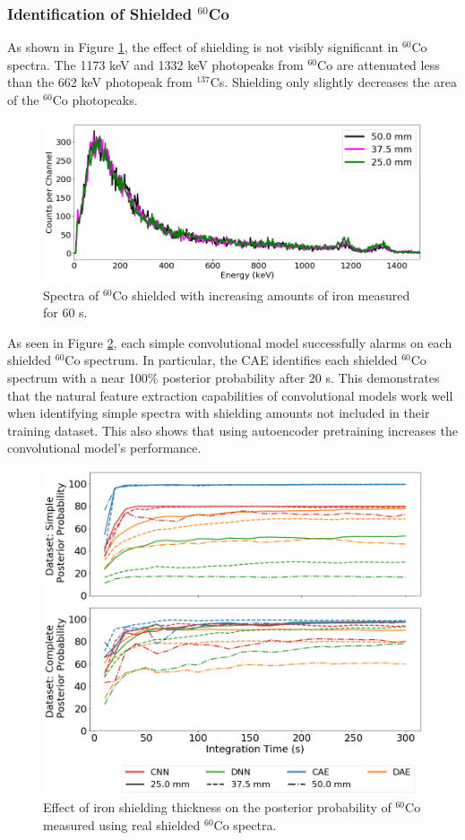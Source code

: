 \subsubsection{Identification of Shielded $^{60}$Co}

As shown in Figure \ref{fig:shielded_co60}, the effect of shielding is not visibly significant in $^{60}$Co spectra. The 1173 keV and 1332 keV photopeaks from $^{60}$Co are attenuated less than the 662 keV photopeak from $^{137}$Cs. Shielding only slightly decreases the area of the $^{60}$Co photopeaks.

\begin{figure}[H]
	\centering
	\includegraphics[width=0.8\linewidth]{images/shielded_co60}	
	\caption{Spectra of $^{60}$Co shielded with increasing amounts of iron measured for 60 s.}
	\label{fig:shielded_co60}
\end{figure}

As seen in Figure \ref{fig:iron_co60}, each simple convolutional model successfully alarms on each shielded  $^{60}$Co spectrum. In particular, the CAE identifies each shielded $^{60}$Co spectrum with a near 100\% posterior probability after 20 s. This demonstrates that the natural feature extraction capabilities of convolutional models work well when identifying simple spectra with shielding amounts not included in their training dataset. This also shows that using autoencoder pretraining increases the convolutional model's performance.

\begin{figure}[H]
	\centering
	\includegraphics[width=0.8\linewidth]{images/iron_co60}	
	\caption{Effect of iron shielding thickness on the posterior probability of $^{60}$Co measured using real shielded $^{60}$Co spectra.}
	\label{fig:iron_co60}
\end{figure}

